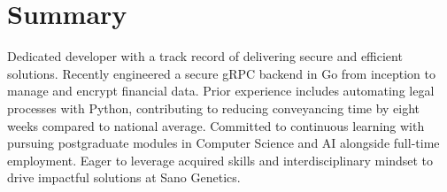 \documentclass{article}
\begin{document}
 \section{Summary}
 Dedicated developer with a track record of delivering secure and efficient solutions. Recently engineered a secure gRPC backend in Go from inception to manage and encrypt financial data. Prior experience includes automating legal processes with Python, contributing to reducing conveyancing time by eight weeks compared to national average. Committed to continuous learning with pursuing postgraduate modules in Computer Science and AI alongside full-time employment. Eager to leverage acquired skills and interdisciplinary mindset to drive impactful solutions at Sano Genetics.
\end{document}
